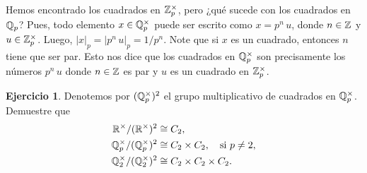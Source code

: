 \documentclass{article}
\numberwithin{equation}{section}
\theoremstyle{definition}
\newtheorem{ejerc}{Ejercicio}
\newif\ifsolutions
\begin{document}
Hemos encontrado los cuadrados en $\ZZ_p^\times$, pero ¿qué sucede con
los cuadrados en $\QQ_p$? Pues, todo elemento $x\in \QQ_p^\times$ puede ser
escrito como $x = p^n\,u$, donde $n\in\mathbb{Z}$ y $u\in\ZZ_p^\times$. Luego,
$|x|_p = |p^n\,u|_p = 1/p^n$. Note que si $x$ es un cuadrado, entonces $n$ tiene
que ser par. Esto nos dice que los cuadrados en $\mathbb{Q}_p^\times$ son precisamente
los números $p^n\,u$ donde $n\in\mathbb{Z}$ es par y $u$ es un cuadrado en
$\ZZ_p^\times$.

\begin{ejerc}
  Denotemos por $(\mathbb{Q}_p^\times)^2$ el grupo multiplicativo de cuadrados en
  $\mathbb{Q}_p^\times$. Demuestre que
  \begin{align*}
    \mathbb{R}^\times / (\mathbb{R}^\times)^2 & \cong C_2,\\
    \mathbb{Q}_p^\times / (\mathbb{Q}_p^\times)^2 & \cong C_2\times C_2, \quad\text{si } p\ne 2,\\
    \mathbb{Q}_2^\times / (\mathbb{Q}_2^\times)^2 & \cong C_2\times C_2\times C_2.
  \end{align*}

  \ifsolutions\begin{solucion}
    Para $p = \infty$ tenemos $\QQ_\infty = \RR$ y un número $x \in \RR^\times$
    es un cuadrado si y solamente si $x > 0$. Así que
    $$[\RR^\times : (\RR^\times)^2] = 2.$$

    Luego, para $p < \infty$ tenemos
    $$\QQ_p^\times \isom \left<p\right>\times\ZZ_p^\times,$$
    donde $\left<p\right> = \{ p^n \mid n\in\ZZ \}$ es el grupo cíclico generado
    por $p$. En efecto, todo número $x\in\QQ_p^\times$ puede ser escrito de modo
    único como $x = p^m\,u$ donde $u \in \ZZ_p^\times$ y $m\in\ZZ$. Es un
    cuadrado si y solamente si $m$ es par y $u$ es un cuadrado en
    $\ZZ_p^\times$. Entonces,
    $$\QQ_p^\times/(\QQ_p^\times)^2 \isom C_2\times \ZZ_p^\times/(\ZZ_p^\times)^2.$$
    Para $p \ne 2$, hemos visto en \ref{prop:cuadrados-en-Zp} que
    $u\in\ZZ_p^\times$ es un cuadrado en $\QQ_p$ si y solamente si es un
    cuadrado módulo $p$. Entonces,
    \[ [\ZZ_p^\times : (\ZZ_p^\times)^2] =
       [(\ZZ/p\ZZ)^\times : ((\ZZ/p\ZZ)^\times)^2] = 2. \]
    Para $p = 2$, hemos visto en \ref{aplicacion:cuadrados-en-Z2} que
    $u\in\ZZ_2^\times$ es un cuadrado si y solamente si $u\equiv
    1\pmod{8}$. Tenemos $(\ZZ/8\ZZ)^\times \isom C_2\times C_2$, así que
    $$\ZZ_2^\times / (\ZZ_2^\times)^2 \isom C_2\times C_2.$$
  \end{solucion}\fi
\end{ejerc}
\end{document}
